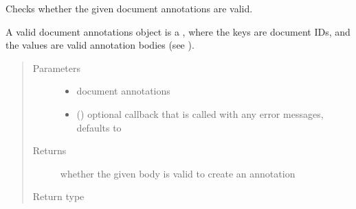 \documentclass[letterpaper,10pt,english]{sphinxmanual}
\begin{document}

\begin{fulllineitems}
\label{\detokenize{autoapi/pine/client/models/index:pine.client.models.is_valid_doc_annotations}}
Checks whether the given document annotations are valid.

A valid document annotations object is a , where the keys are 
document IDs, and the values are valid annotation bodies (see {\hyperref[\detokenize{autoapi/pine/client/models/index:pine.client.models.is_valid_annotation}]{}}).
\begin{quote}\begin{description}
\item[{Parameters}] \leavevmode\begin{itemize}
\item {} 
 \textendash{} document annotations

\item {} 
 (\sphinxstyleliteralemphasis{\sphinxupquote{, }}) \textendash{} optional callback that is called with any error messages, defaults to 

\end{itemize}

\item[{Returns}] \leavevmode
whether the given body is valid to create an annotation

\item[{Return type}] \leavevmode
{}

\end{description}\end{quote}

\end{fulllineitems}
\end{document}
